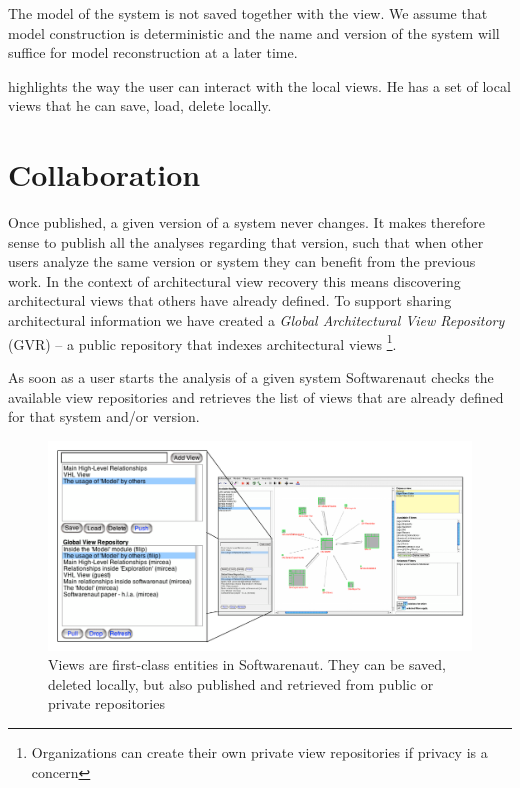 \documentclass[preprint,12pt]{elsarticle}
\begin{document}
The model of the system is not saved together with the view. We assume that model construction is deterministic and the name and version of the system will suffice for model reconstruction at a later time. %



 highlights the way the user can interact with the local views. He has a set of local views that he can save, load, delete locally. 


\newpage
\section {Collaboration}
\label {sec:collab}


Once published, a given version of a system never changes. It makes therefore sense to publish all the analyses regarding that version, such that when other users analyze the same version or system they can benefit from the previous work. In the context of architectural view recovery this means discovering architectural views that others have already defined. To support sharing architectural information we have created a {\em Global Architectural View Repository} (GVR) -- a public repository that indexes architectural views \footnote{
Organizations can create their own private view repositories if privacy is a concern}.


As soon as a user starts the analysis of a given system Softwarenaut checks the available view repositories and retrieves the list of views that are already defined for that system and/or version.


\begin{figure}[h]
\begin{center}
\includegraphics[width=\linewidth]{ViewOperations}
\caption{Views are first-class entities in Softwarenaut. They can be saved, deleted locally, but also published and retrieved from public or private repositories}
\end{center}
\end{figure}
\end{document}
